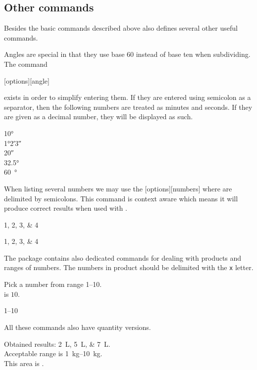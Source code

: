 \subsection{Other  commands}

Besides the basic commands described above  also defines several
other useful commands.

Angles are special in that they use base $60$ instead of base ten when
subdividing. The command
\begin{lscommand}
  [options][angle]
\end{lscommand}
exists in order to simplify entering them. If they are entered using semicolon
as a separator, then the following numbers are treated as minutes and seconds.
If they are given as a decimal number, they will be displayed as such.
\begin{example}
\ang{10} \\
\ang{1;2;3} \\
\ang{;;20} \\
\ang{32.5} \\
\qty{60}{\degree}
\end{example}

When listing several numbers we may use the [options][numbers]
where  are delimited by semicolons. This command is context aware
which means it will produce correct results when used with .
\begin{example}
\numlist{1;2;3;4}

\begin{german}
  \numlist{1;2;3;4}
\end{german}
\end{example}

The package contains also dedicated commands for dealing with products and
ranges of numbers. The numbers in product should be delimited with the \verb|x|
letter.
\begin{example}
Pick a number from
range \numrange{1}{10}. \\
 is $10$. \\
\begin{german}
  \numrange{1}{10}
\end{german}
\end{example}

All these commands also have quantity versions.
\begin{example}
Obtained results:
\qtylist{2;5;7}{\L}.\\
Acceptable range is
\qtyrange{1}{10}{\kg}. \\
This area is
.
\end{example}

